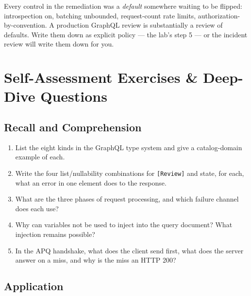 \begin{warningbox}
Every control in the remediation was a \emph{default} somewhere waiting to
be flipped: introspection on, batching unbounded, request-count rate
limits, authorization-by-convention. A production GraphQL review is
substantially a review of defaults. Write them down as explicit policy ---
the lab's step 5 --- or the incident review will write them down for you.
\end{warningbox}

\section{Self-Assessment Exercises \& Deep-Dive Questions}
\label{sec:ch12-exercises}

\subsection{Recall and Comprehension}

\begin{enumerate}
  \item List the eight kinds in the GraphQL type system and give a
        catalog-domain example of each.
  \item Write the four list/nullability combinations for
        \texttt{[Review]} and state, for each, what an error in one
        element does to the response.
  \item What are the three phases of request processing, and which
        failure channel does each use?
  \item Why can variables not be used to inject into the query document?
        What injection remains possible?
  \item In the APQ handshake, what does the client send first, what does
        the server answer on a miss, and why is the miss an HTTP 200?
\end{enumerate}

\subsection{Application}

